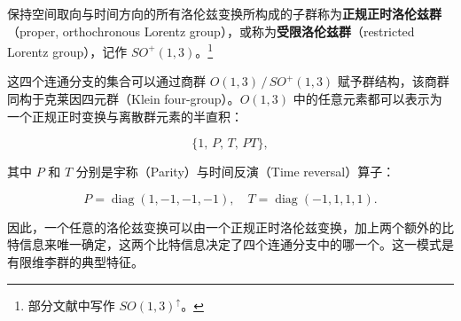 保持空间取向与时间方向的所有洛伦兹变换所构成的子群称为\textbf{正规正时洛伦兹群}（proper, orthochronous Lorentz group），或称为\textbf{受限洛伦兹群}（restricted Lorentz group），记作 $SO^{+}(1,3)$。\footnote{部分文献中写作 $SO(1,3)^{\uparrow}$。}

这四个连通分支的集合可以通过商群 $O(1,3)\,/\,SO^{+}(1,3)$ 赋予群结构，该商群同构于克莱因四元群（Klein four-group）。$O(1,3)$ 中的任意元素都可以表示为一个正规正时变换与离散群元素的半直积：

\[
\{1,\, P,\, T,\, PT\},
\]

其中 $P$ 和 $T$ 分别是宇称（Parity）与时间反演（Time reversal）算子：

\[
P = \operatorname{diag}(1,-1,-1,-1), 
\quad 
T = \operatorname{diag}(-1,1,1,1).
\]

因此，一个任意的洛伦兹变换可以由一个正规正时洛伦兹变换，加上两个额外的比特信息来唯一确定，这两个比特信息决定了四个连通分支中的哪一个。这一模式是有限维李群的典型特征。
